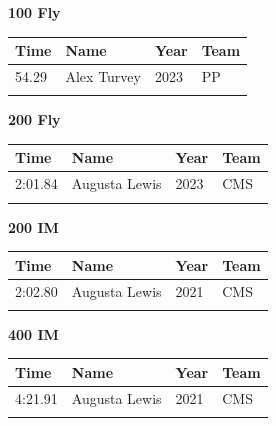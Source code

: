 \noindent\begin{minipage}[t]{0.98\textwidth}
\centering
\textbf{\textcolor{teamprimary}{100 Fly}}\par
\vspace{0.5em}
\centering
\small
\renewcommand{\arraystretch}{1.0}
\setlength{\tabcolsep}{4pt}
\begin{tabular}{@{}p{2.5cm}p{4.5cm}p{1.5cm}p{2.5cm}@{}}
\toprule
\textbf{Time} & \textbf{Name} & \textbf{Year} & \textbf{Team} \\
\midrule
54.29 & Alex Turvey & 2023 & PP \\
\bottomrule
\vspace{0.5em}
\end{tabular}
\end{minipage}
\vspace{1.2em}
\noindent\begin{minipage}[t]{0.98\textwidth}
\centering
\textbf{\textcolor{teamprimary}{200 Fly}}\par
\vspace{0.5em}
\centering
\small
\renewcommand{\arraystretch}{1.0}
\setlength{\tabcolsep}{4pt}
\begin{tabular}{@{}p{2.5cm}p{4.5cm}p{1.5cm}p{2.5cm}@{}}
\toprule
\textbf{Time} & \textbf{Name} & \textbf{Year} & \textbf{Team} \\
\midrule
2:01.84 & Augusta Lewis & 2023 & CMS \\
\bottomrule
\vspace{0.5em}
\end{tabular}
\end{minipage}
\vspace{1.2em}
\noindent\begin{minipage}[t]{0.98\textwidth}
\centering
\textbf{\textcolor{teamprimary}{200 IM}}\par
\vspace{0.5em}
\centering
\small
\renewcommand{\arraystretch}{1.0}
\setlength{\tabcolsep}{4pt}
\begin{tabular}{@{}p{2.5cm}p{4.5cm}p{1.5cm}p{2.5cm}@{}}
\toprule
\textbf{Time} & \textbf{Name} & \textbf{Year} & \textbf{Team} \\
\midrule
2:02.80 & Augusta Lewis & 2021 & CMS \\
\bottomrule
\vspace{0.5em}
\end{tabular}
\end{minipage}
\vspace{1.2em}
\noindent\begin{minipage}[t]{0.98\textwidth}
\centering
\textbf{\textcolor{teamprimary}{400 IM}}\par
\vspace{0.5em}
\centering
\small
\renewcommand{\arraystretch}{1.0}
\setlength{\tabcolsep}{4pt}
\begin{tabular}{@{}p{2.5cm}p{4.5cm}p{1.5cm}p{2.5cm}@{}}
\toprule
\textbf{Time} & \textbf{Name} & \textbf{Year} & \textbf{Team} \\
\midrule
4:21.91 & Augusta Lewis & 2021 & CMS \\
\bottomrule
\vspace{0.5em}
\end{tabular}
\end{minipage}
